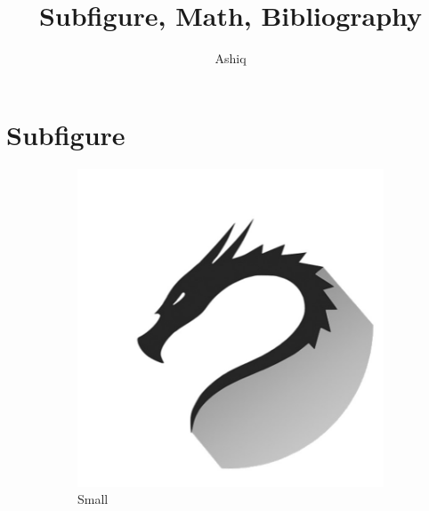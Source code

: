 \documentclass[a4paper, 12pt]{article}
\title{Subfigure, Math, Bibliography}
\author{Ashiq}
\begin{document}
	\maketitle
	\tableofcontents
	\listoffigures
	\newpage
	
	\section{Subfigure}
	\begin{figure}[h]
		\begin{subfigure}[t]{0.2\textwidth}
			\centering
			\includegraphics[width=\textwidth]{star.png}
			\caption{Small}
		\end{subfigure}
		~
		\begin{subfigure}[b]{0.6\textwidth}
			\centering

\end{subfigure}
\end{figure}
\end{document}
